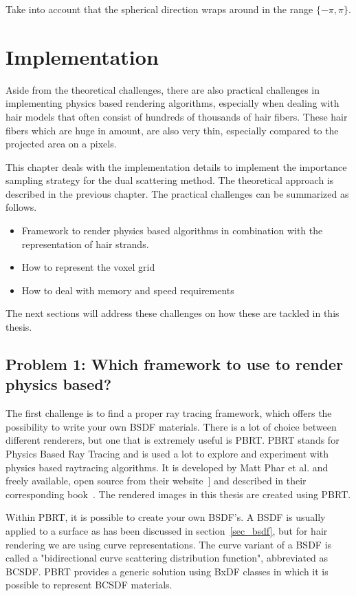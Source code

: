 \documentclass[11pt,a4paper]{report}
\begin{document}
Take into account that the spherical direction wraps around in the range $\{ -\pi, \pi \}$.


\chapter{Implementation}

Aside from the theoretical challenges, there are also practical challenges in implementing physics based rendering algorithms, especially when dealing with hair models that often consist of hundreds of thousands of hair fibers. These hair fibers which are huge in amount, are also very thin, especially compared to the projected area on a pixels.

This chapter deals with the implementation details to implement the importance sampling strategy for the dual scattering method. The theoretical approach is described in the previous chapter. The practical challenges can be summarized as follows.

\begin{itemize}
    \item Framework to render physics based algorithms in combination with the representation of hair strands.
    \item How to represent the voxel grid
    \item How to deal with memory and speed requirements
\end{itemize}

The next sections will address these challenges on how these are tackled in this thesis.


\section{Problem 1: Which framework to use to render physics based?}

The first challenge is to find a proper ray tracing framework, which offers the possibility to write your own BSDF materials. There is a lot of choice between different renderers, but one that is extremely useful is PBRT. PBRT stands for Physics Based Ray Tracing and is used a lot to explore and experiment with physics based raytracing algorithms. It is developed by Matt Phar et al. and freely available, open source from their website~] and described in their corresponding book~\cite{pbrt}. The rendered images in this thesis are created using PBRT.

Within PBRT, it is possible to create your own BSDF's. A BSDF is usually applied to a surface as has been discussed in section~\ref{sec_bsdf}, but for hair rendering we are using curve representations. The curve variant of a BSDF is called a "bidirectional curve scattering distribution function", abbreviated as BCSDF. PBRT provides a generic solution using BxDF classes in which it is possible to represent BCSDF materials.
\end{document}
